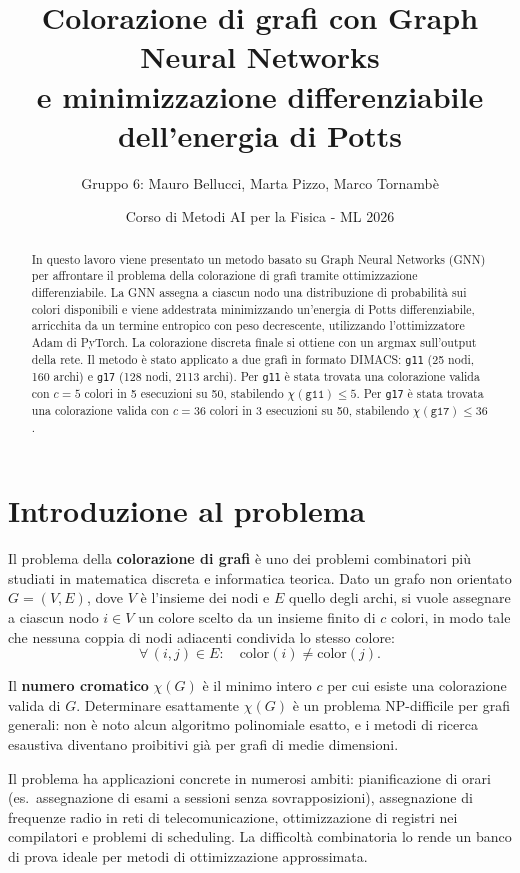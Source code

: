 \documentclass[11pt, a4paper]{article}
\title{\textbf{Colorazione di grafi con Graph Neural Networks\\
e minimizzazione differenziabile dell'energia di Potts}}
\author{Gruppo 6: Mauro Bellucci, Marta Pizzo, Marco Tornambè}
\date{Corso di Metodi AI per la Fisica - ML 2026}
\begin{document}
\maketitle

\begin{abstract}
In questo lavoro viene presentato un metodo basato su Graph Neural Networks (GNN) per
affrontare il problema della colorazione di grafi tramite ottimizzazione differenziabile.
La GNN assegna a ciascun nodo una distribuzione di probabilità sui colori disponibili e
viene addestrata minimizzando un'energia di Potts differenziabile, arricchita da un termine
entropico con peso decrescente, utilizzando l'ottimizzatore Adam di PyTorch. La colorazione
discreta finale si ottiene con un argmax sull'output della rete. Il metodo è stato applicato
a due grafi in formato DIMACS: \texttt{g11} (25 nodi, 160 archi) e \texttt{g17} (128
nodi, 2113 archi). Per \texttt{g11} è stata trovata una colorazione valida con $c = 5$
colori in 5 esecuzioni su 50, stabilendo $\chi(\texttt{g11}) \leq 5$. Per \texttt{g17}
è stata trovata una colorazione valida con $c = 36$ colori in 3 esecuzioni su 50,
stabilendo $\chi(\texttt{g17}) \leq 36$.
\end{abstract}

\section{Introduzione al problema}

Il problema della \textbf{colorazione di grafi} è uno dei problemi combinatori più studiati
in matematica discreta e informatica teorica. Dato un grafo non orientato $G = (V, E)$,
dove $V$ è l'insieme dei nodi e $E$ quello degli archi, si vuole assegnare a ciascun nodo
$i \in V$ un colore scelto da un insieme finito di $c$ colori, in modo tale che nessuna
coppia di nodi adiacenti condivida lo stesso colore:
\begin{equation}
    \forall\,(i,j) \in E: \quad \mathrm{color}(i) \neq \mathrm{color}(j).
\end{equation}

Il \textbf{numero cromatico} $\chi(G)$ è il minimo intero $c$ per cui esiste una
colorazione valida di $G$. Determinare esattamente $\chi(G)$ è un problema NP-difficile
per grafi generali: non è noto alcun algoritmo polinomiale esatto, e i metodi di ricerca
esaustiva diventano proibitivi già per grafi di medie dimensioni.

Il problema ha applicazioni concrete in numerosi ambiti: pianificazione di orari (es.\
assegnazione di esami a sessioni senza sovrapposizioni), assegnazione di frequenze radio in
reti di telecomunicazione, ottimizzazione di registri nei compilatori e problemi di
scheduling. La difficoltà combinatoria lo rende un banco di prova ideale per metodi di
ottimizzazione approssimata.
\end{document}
